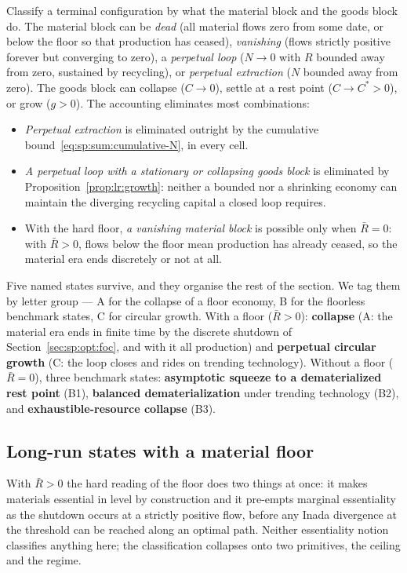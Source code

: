 Classify a terminal configuration by what the material block and the goods block do. The material block can be \emph{dead} (all material flows zero from some date, or below the floor so that production has ceased), \emph{vanishing} (flows strictly positive forever but converging to zero), a \emph{perpetual loop} ($N\to0$ with $R$ bounded away from zero, sustained by recycling), or \emph{perpetual extraction} ($N$ bounded away from zero). The goods block can collapse ($C\to0$), settle at a rest point ($C\to C^*>0$), or grow ($g>0$). The accounting eliminates most combinations:

\begin{itemize}
\item \emph{Perpetual extraction} is eliminated outright by the cumulative bound~\eqref{eq:sp:sum:cumulative-N}, in every cell.
\item \emph{A perpetual loop with a stationary or collapsing goods block} is eliminated by Proposition~\ref{prop:lr:growth}: neither a bounded nor a shrinking economy can maintain the diverging recycling capital a closed loop requires.
\item With the hard floor, \emph{a vanishing material block} is possible only when $\bar R=0$: with $\bar R>0$, flows below the floor mean production has already ceased, so the material era ends discretely or not at all.
\end{itemize}

Five named states survive, and they organise the rest of the section. We tag them by letter group --- A for the collapse of a floor economy, B for the floorless benchmark states, C for circular growth. With a floor ($\bar R>0$): \textbf{collapse} (A: the material era ends in finite time by the discrete shutdown of Section~\ref{sec:sp:opt:foc}, and with it all production) and \textbf{perpetual circular growth} (C: the loop closes and rides on trending technology). Without a floor ($\bar R=0$), three benchmark states: \textbf{asymptotic squeeze to a dematerialized rest point} (B1), \textbf{balanced dematerialization} under trending technology (B2), and \textbf{exhaustible-resource collapse} (B3).

\subsection{Long-run states with a material floor}\label{sec:sp:longrun:floor}

With $\bar R>0$ the hard reading of the floor does two things at once: it makes materials essential in level by construction and it pre-empts marginal essentiality as the shutdown occurs at a strictly positive flow, before any Inada divergence at the threshold can be reached along an optimal path. Neither essentiality notion classifies anything here; the classification collapses onto two primitives, the ceiling and the regime.

